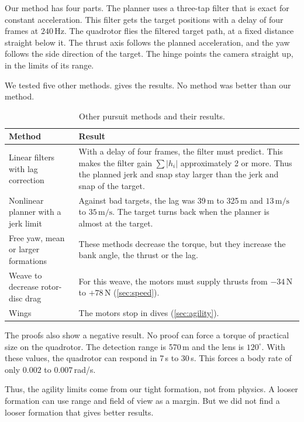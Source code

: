 \documentclass[11pt]{article}
\newcommand{\ms}{\,\mathrm{m/s}}
\begin{document}
Our method has four parts.
The planner uses a three-tap filter that is exact for constant acceleration.
This filter gets the target positions with a delay of four frames at $240$\,Hz.
The quadrotor flies the filtered target path, at a fixed distance straight below it.
The thrust axis follows the planned acceleration, and the yaw follows the side direction of
the target.
The hinge points the camera straight up, in the limits of its range.

We tested five other methods.
 gives the results.
No method was better than our method.

\begin{table}[h]
\centering
\caption{Other pursuit methods and their results.}
\label{tab:alternatives}
\begin{tabularx}{\linewidth}{@{}lY@{}}
\toprule
Method & Result \\
\midrule
Linear filters with lag correction & With a delay of four frames, the filter must predict. This makes the filter gain $\sum|h_i|$ approximately 2 or more. Thus the planned jerk and snap stay larger than the jerk and snap of the target. \\
Nonlinear planner with a jerk limit & Against bad targets, the lag was 39\,m to 325\,m and $13\ms$ to $35\ms$. The target turns back when the planner is almost at the target. \\
Free yaw, mean or larger formations & These methods decrease the torque, but they increase the bank angle, the thrust or the lag. \\
Weave to decrease rotor-disc drag & For this weave, the motors must supply thrusts from $-34$\,N to $+78$\,N (\cref{sec:speed}). \\
Wings & The motors stop in dives (\cref{sec:agility}). \\
\bottomrule
\end{tabularx}
\end{table}

The proofs also show a negative result.
No proof can force a torque of practical size on the quadrotor.
The detection range is 570\,m and the lens is $120^\circ$.
With these values, the quadrotor can respond in 7\,s to 30\,s.
This forces a body rate of only $0.002$ to $0.007$\,rad/s.

Thus, the agility limits come from our tight formation, not from physics.
A looser formation can use range and field of view as a margin.
But we did not find a looser formation that gives better results.
\end{document}
